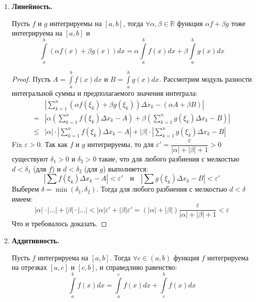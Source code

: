 \documentclass[12pt]{article}
\newcommand{\dint}{\displaystyle\int}
\begin{document}
	\begin{enumerate}
		\item \textbf{Линейность.}
		
		Пусть $f$ и $g$ интегрируемы на $[a, b]$, тогда $\forall \alpha, \beta \in \mathbb{R}$ функция $\alpha f + \beta g$ тоже интегрируема на $[a, b]$ и 
		$$ \dint\limits_a^b (\alpha f(x) + \beta g(x)) dx = \alpha \dint\limits_a^b f(x) dx + \beta \dint\limits_a^b g(x) dx $$
		
		\begin{proof}
			Пусть $A = \dint\limits_a^b f(x) dx$ и $B = \dint\limits_a^b g(x) dx$. Рассмотрим модуль разности интегральной суммы и предполагаемого значения интеграла:
			\begin{align*}
				&\left| \sum\limits_{k = 1}^n (\alpha f(\xi_k) + \beta g(\xi_k))\varDelta x_k - (\alpha A + \beta B) \right| \\
				={}& \left| \alpha \left(\sum\limits_{k = 1}^n f(\xi_k)\varDelta x_k - A\right) + \beta \left(\sum\limits_{k = 1}^n g(\xi_k)\varDelta x_k - B\right) \right| \\
				\leqslant{}& |\alpha| \cdot \left| \sum\limits_{k = 1}^n f(\xi_k)\varDelta x_k - A \right| + |\beta| \cdot \left| \sum\limits_{k = 1}^n g(\xi_k)\varDelta x_k - B \right|
			\end{align*}
			Fix $\varepsilon > 0$. Так как $f$ и $g$ интегрируемы, то для $\varepsilon' = \dfrac{\varepsilon}{|\alpha| + |\beta| + 1} > 0$ существуют $\delta_1 > 0$ и $\delta_2 > 0$ такие, что для любого разбиения с мелкостью $d < \delta_1$ (для $f$) и $d < \delta_2$ (для $g$) выполняется:
			$$ \left| \sum f(\xi_k)\varDelta x_k - A \right| < \varepsilon' \quad \text{и} \quad \left| \sum g(\xi_k)\varDelta x_k - B \right| < \varepsilon' $$
			Выберем $\delta = \min(\delta_1, \delta_2)$. Тогда для любого разбиения с мелкостью $d < \delta$ имеем:
			$$ |\alpha| \cdot \left| \dots \right| + |\beta| \cdot \left| \dots \right| < |\alpha|\varepsilon' + |\beta|\varepsilon' = (|\alpha| + |\beta|)\frac{\varepsilon}{|\alpha| + |\beta| + 1} < \varepsilon $$
			Что и требовалось доказать.
		\end{proof}
		
		\item \textbf{Аддитивность.}
		
		Пусть $f$ интегрируема на $[a, b]$. Тогда $\forall c \in (a, b)$ функция $f$ интегрируема на отрезках $[a, c]$ и $[c, b]$, и справедливо равенство:
		$$ \dint\limits_a^b f(x) dx = \dint\limits_a^c f(x) dx + \dint\limits_c^b f(x) dx $$
		

\end{enumerate}
\end{document}
